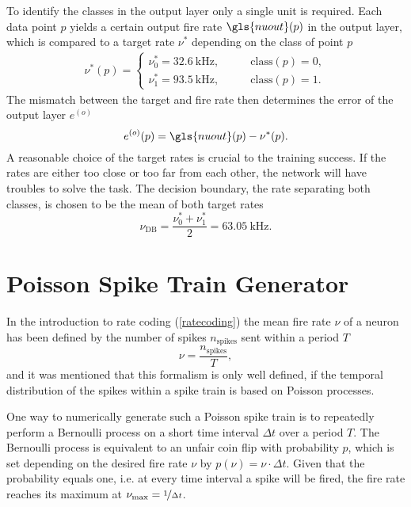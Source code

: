 To identify the classes in the output layer only a single unit is required. Each data point $p$ yields a certain output fire rate $\gls{nuout}(p)$ in the output layer, which is compared to a target rate $\nu^*$ depending on the class of point $p$
\begin{align}
\nu^*(p) =
\begin{cases}
\nu_0^* = \SI{32.6}{\kilo \Hz} ,&\quad \quad \text{class}(p) = 0,\\
\nu_1^* = \SI{93.5}{\kilo \Hz} ,&\quad \quad \text{class}(p) = 1.
\end{cases}
\label{circlestarget}
\end{align}
The mismatch between the target and fire rate then determines the error of the output layer $e^{(o)}$
\begin{equation*}
e^{(o)}(p) = \gls{nuout}(p) - \nu^*(p).
\end{equation*}
A reasonable choice of the target rates is crucial to the training success. If the rates are either too close or too far from each other, the network will have troubles to solve the task. The decision boundary, the rate separating both classes, is chosen to be the mean of both target rates
\begin{equation*}
\nu_\text{DB} = \frac{\nu_0^* + \nu_1^*}{2} = \SI{63.05}{\kilo \Hz}.
\end{equation*}


\section{Poisson Spike Train Generator}
\label{poissonspiketrains}
In the introduction to rate coding (\cref{ratecoding}) the mean fire rate $\nu$ of a neuron has been defined by the number of spikes $n_\text{spikes}$ sent within a period $T$
\begin{equation*}
\nu = \frac{n_\text{spikes}}{T},
\end{equation*}
and it was mentioned that this formalism is only well defined, if the temporal distribution of the spikes within a spike train is based on Poisson processes.

One way to numerically generate such a Poisson spike train is to repeatedly perform a Bernoulli process on a short time interval $\Delta t$ over a period $T$. The Bernoulli process is equivalent to an unfair coin flip with probability $p$, which is set depending on the desired fire rate $\nu$ by $p(\nu) = \nu \cdot \Delta t$. Given that the probability equals one, i.e. at every time interval a spike will be fired, the fire rate reaches its maximum at $\nu_\text{max} = \nicefrac{1}{\Delta t}$.

